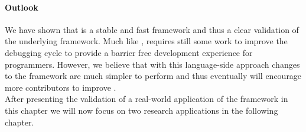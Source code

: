 \paragraph{\NB Outlook}
We have shown that \NB is a stable and fast \FFI framework and thus a clear validation of the underlying \B framework.
Much like \B, \NB requires still some work to improve the debugging cycle to provide a barrier free development experience for \PH programmers.
However, we believe that with this language-side approach changes to the \FFI framework are much simpler to perform and thus eventually will encourage more contributors to improve \NB.\\

\noindent After presenting the validation of a real-world application of the \B framework in this chapter we will now focus on two research applications in the following chapter.


